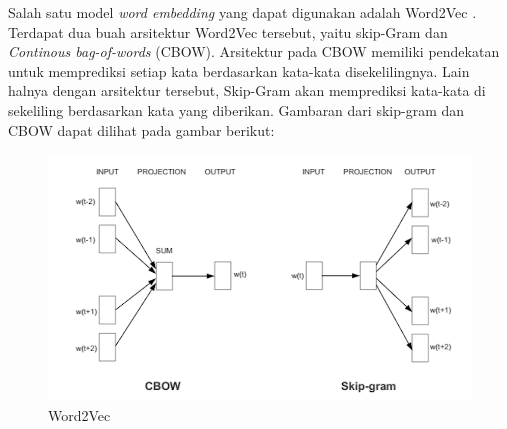 Salah satu model \textit{word embedding} yang dapat digunakan adalah Word2Vec \citep{mikolov2013distributed}. Terdapat dua buah arsitektur Word2Vec tersebut, yaitu skip-Gram dan \textit{Continous bag-of-words} (CBOW). Arsitektur pada CBOW memiliki pendekatan untuk memprediksi setiap kata berdasarkan kata-kata disekelilingnya. Lain halnya dengan arsitektur tersebut, Skip-Gram akan memprediksi kata-kata di sekeliling berdasarkan kata yang diberikan. Gambaran dari skip-gram dan CBOW dapat dilihat pada gambar berikut:

\begin{figure}
	\centering
	\includegraphics[width=1\linewidth]{adit_pics/word2vec_diagrams.png}
	\caption{Word2Vec}
	\label{fig:Word2Vec}
\end{figure}